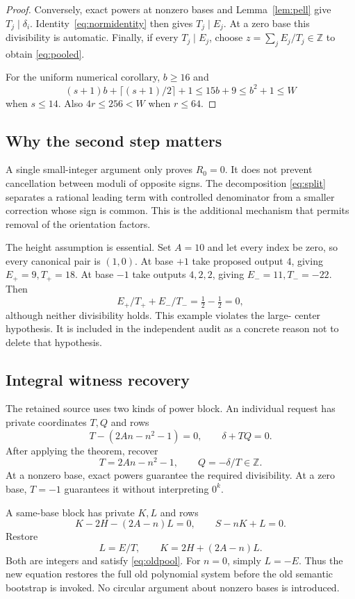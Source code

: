 \documentclass[10pt,letterpaper]{article}
\theoremstyle{remark}\newtheorem{remark}[theorem]{Remark}
\newcommand{\Z}{\mathbb Z}\newcommand{\Q}{\mathbb Q}\newcommand{\N}{\mathbb N}
\begin{document}
\begin{proof}
Conversely, exact powers at nonzero bases and Lemma~\ref{lem:pell}
give $T_j\mid\delta_i$. Identity~\eqref{eq:normidentity} then gives
$T_j\mid E_j$. At a zero base this divisibility is automatic. Finally,
if every $T_j\mid E_j$, choose $z=\sum_j E_j/T_j\in\Z$ to obtain
\eqref{eq:pooled}.

For the uniform numerical corollary, $b\ge16$ and
\[
 (s+1)b+\lceil(s+1)/2\rceil+1\le15b+9\le b^2+1\le W
\]
when $s\le14$. Also $4r\le256<W$ when $r\le64$.
\end{proof}

\subsection{Why the second step matters}

A single small-integer argument only proves $R_0=0$. It does not prevent
cancellation between moduli of opposite signs. The decomposition
\eqref{eq:split} separates a rational leading term with controlled
denominator from a smaller correction whose sign is common. This is the
additional mechanism that permits removal of the orientation factors.

The height assumption is essential. Set $A=10$ and let every index be
zero, so every canonical pair is $(1,0)$. At base $+1$ take proposed
output $4$, giving $E_+=9,T_+=18$. At base $-1$ take outputs $4,2,2$,
giving $E_-=11,T_-=-22$. Then
\[
 E_+/T_++E_-/T_- =\tfrac12-\tfrac12=0,
\]
although neither divisibility holds. This example violates the large-
center hypothesis. It is included in the independent audit as a concrete
reason not to delete that hypothesis.

\subsection{Integral witness recovery}

The retained source uses two kinds of power block. An individual request
has private coordinates $T,Q$ and rows
\[
 T-(2An-n^2-1)=0,\qquad \delta+TQ=0.
\]
After applying the theorem, recover
\[
 T=2An-n^2-1,\qquad Q=-\delta/T\in\Z.
\]
At a nonzero base, exact powers guarantee the required divisibility.
At a zero base, $T=-1$ guarantees it without interpreting $0^k$.

A same-base block has private $K,L$ and rows
\begin{equation}
 K-2H-(2A-n)L=0,\qquad S-nK+L=0.\label{eq:oldpool}
\end{equation}
Restore
\[
 L=E/T,\qquad K=2H+(2A-n)L.
\]
Both are integers and satisfy \eqref{eq:oldpool}. For $n=0$, simply
$L=-E$. Thus the new equation restores the full old polynomial system
before the old semantic bootstrap is invoked. No circular argument
about nonzero bases is introduced.
\end{document}

